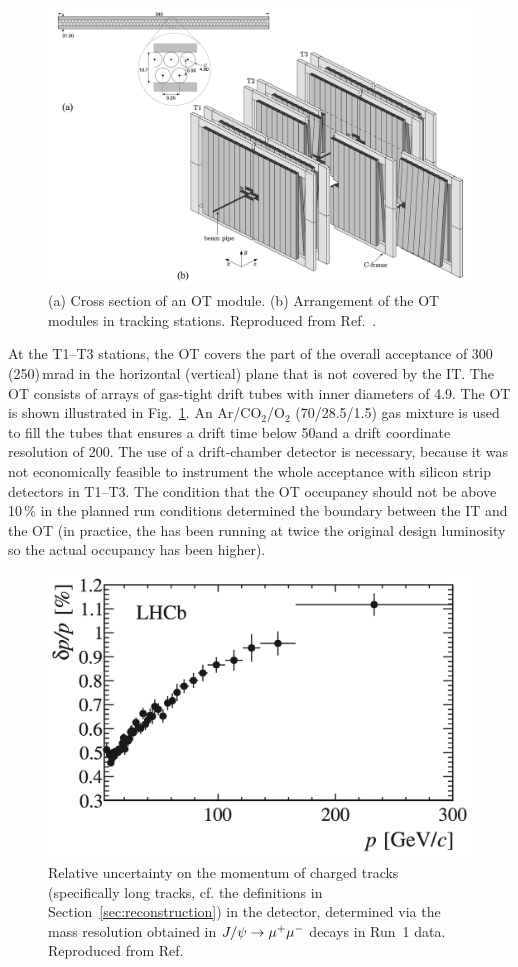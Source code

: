 \begin{figure}[tb]
    \centering
    \includegraphics[width=\columnwidth]{figures/detector/OT_stations.png}
    \caption{(a) Cross section of an OT module. (b) Arrangement of the OT modules in tracking stations. Reproduced from Ref.~\cite{OT-Performance}.}
    \label{fig:OT_station}
\end{figure}

At the T1--T3 stations, the OT covers the part of the overall acceptance of 300 (250)\,mrad in the horizontal (vertical) plane that is not covered by the IT. The OT consists of arrays of gas-tight drift tubes with inner diameters of 4.9\mm. The OT is shown illustrated in Fig.~\ref{fig:OT_station}. An Ar/CO$_2$/O$_2$ (70/28.5/1.5) gas mixture is used to fill the tubes that ensures a drift time below 50\ns and a drift coordinate resolution of 200\mum. The use of a drift-chamber detector is necessary, because it was not economically feasible to instrument the whole \lhcb acceptance with silicon strip detectors in T1--T3. The condition that the OT occupancy should not be above 10\,\% in the planned run conditions determined the boundary between the IT and the OT (in practice, the \lhcb has been running at twice the original design luminosity so the actual occupancy has been higher). 

\begin{figure}[tb]
    \centering
    \includegraphics[width=0.65\columnwidth]{figures/detector/momentum_resolution.png}
    \caption{Relative uncertainty on the momentum of charged tracks (specifically long tracks, cf. the definitions in Section~\ref{sec:reconstruction}) in the \lhcb detector, determined via the mass resolution obtained in $J/\psi\rightarrow{\ensuremath{\mu^+}}\mu^-$ decays in Run~1 data. Reproduced from Ref.~\cite{LHCb-Performance}}
    \label{fig:momentum_resolution}
\end{figure}

